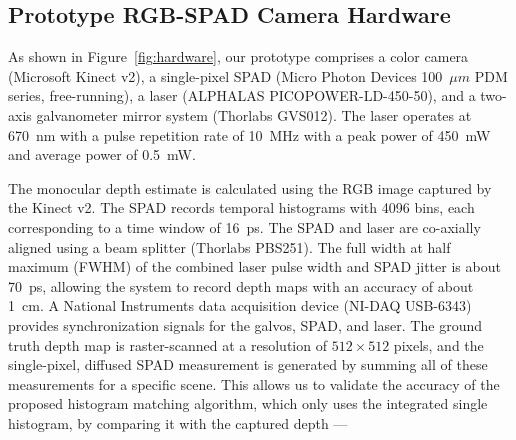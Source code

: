 
\subsection{Prototype RGB-SPAD Camera Hardware}


As shown in Figure~\ref{fig:hardware}, our prototype comprises a color camera
(Microsoft Kinect v2), a single-pixel SPAD (Micro Photon Devices 100~$\mu m$ PDM
series, free-running), a laser (ALPHALAS PICOPOWER-LD-450-50), and a two-axis
galvanometer mirror system (Thorlabs GVS012). The laser operates at 670~nm with
a pulse repetition rate of 10~MHz with a peak power of 450~mW and average power
of 0.5~mW.

The monocular depth estimate is calculated
using the RGB image captured by the Kinect v2.
The SPAD records temporal histograms with 4096 bins, each corresponding to a
time window of 16~ps. The SPAD and laser are co-axially aligned using a beam
splitter (Thorlabs PBS251). The full width at half maximum (FWHM) of the
combined laser pulse width and SPAD jitter is about 70~ps, allowing the system
to record depth maps with an accuracy of about 1~cm. A National Instruments data
acquisition device (NI-DAQ USB-6343) provides synchronization signals for the
galvos, SPAD, and laser. The ground truth depth map is raster-scanned at a
resolution of $512 \times 512$ pixels, and the single-pixel, diffused SPAD
measurement is generated by summing all of these measurements for a specific
scene. This allows us to validate the accuracy of the proposed histogram
matching algorithm, which only uses the integrated single histogram, by
comparing it with the captured depth --- 

